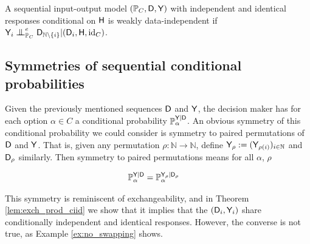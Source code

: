 \begin{definition}\label{def:weak_di}
A sequential input-output model $(\mathbb{P}_C,\mathsf{D},\mathsf{Y})$ with independent and identical responses conditional on $\mathsf{H}$ is weakly data-independent if $\RV{Y}_i\CI^e_{\prob{P}_C} \RV{D}_{\mathbb{N}\setminus\{i\}}|(\RV{D}_{i},\RV{H},\text{id}_C)$.
\end{definition}

\subsection[Conditional probability symmetries]{Symmetries of sequential conditional probabilities}\label{sec:ccontracibility}

Given the previously mentioned sequences $\mathsf{D}$ and $\mathsf{Y}$, the decision maker has for each option $\alpha\in C$ a conditional probability $\mathbb{P}_\alpha^{\mathsf{Y}|\mathsf{D}}$. An obvious symmetry of this conditional probability we could consider is symmetry to paired permutations of $\mathsf{D}$ and $\mathsf{Y}$. That is, given any permutation $\rho:\mathbb{N}\to \mathbb{N}$, define $\mathsf{Y}_\rho:=(\mathsf{Y}_{\rho(i)})_{i\in\mathbb{N}}$ and $\mathsf{D}_{\rho}$ similarly. Then symmetry to paired permutations means for all $\alpha$, $\rho$

\begin{align}
    \mathbb{P}_\alpha^{\mathsf{Y}|\mathsf{D}} &= \mathbb{P}_\alpha^{\mathsf{Y}_\rho|\mathsf{D}_\rho}
\end{align}

This symmetry is reminiscent of exchangeability, and in Theorem \ref{lem:exch_prod_ciid} we show that it implies that the $(\mathsf{D}_i,\mathsf{Y}_i)$ share conditionally independent and identical responses. However, the converse is not true, as Example \ref{ex:no_swapping} shows.

